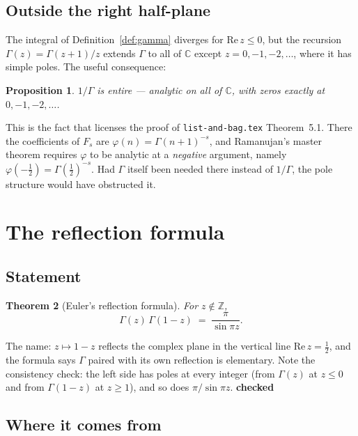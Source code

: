 \documentclass[11pt,a4paper]{article}
\newtheorem{theorem}{Theorem}[section]
\newtheorem{proposition}[theorem]{Proposition}
\theoremstyle{definition}
\theoremstyle{remark}
\newcommand{\CC}{\mathbb{C}}
\newcommand{\ZZ}{\mathbb{Z}}
\newcommand{\OK}{\textcolor{okgreen}{\textbf{checked}}}
\begin{document}
\subsection{Outside the right half-plane}

The integral of Definition~\ref{def:gamma} diverges for $\mathrm{Re}\,z \le 0$, but the
recursion $\Gamma(z) = \Gamma(z+1)/z$ extends $\Gamma$ to all of $\CC$ except
$z = 0, -1, -2, \dots$, where it has simple poles. The useful consequence:

\begin{proposition}\label{prop:entire}
$1/\Gamma$ is entire --- analytic on all of $\CC$, with zeros exactly at
$0, -1, -2, \dots$.
\end{proposition}

This is the fact that licenses the proof of \texttt{list-and-bag.tex}
Theorem~5.1. There the coefficients of $F_s$ are $\varphi(n) = \Gamma(n+1)^{-s}$, and
Ramanujan's master theorem requires $\varphi$ to be analytic at a \emph{negative}
argument, namely $\varphi(-\tfrac12) = \Gamma(\tfrac12)^{-s}$. Had $\Gamma$ itself
been needed there instead of $1/\Gamma$, the pole structure would have obstructed it.

\section{The reflection formula}

\subsection{Statement}

\begin{theorem}[Euler's reflection formula]\label{thm:reflect}
For $z \notin \ZZ$,
\[
  \Gamma(z)\,\Gamma(1-z) \;=\; \frac{\pi}{\sin \pi z} .
\]
\end{theorem}

The name: $z \mapsto 1-z$ reflects the complex plane in the vertical line
$\mathrm{Re}\,z = \tfrac12$, and the formula says $\Gamma$ paired with its own
reflection is elementary. Note the consistency check: the left side has poles at every
integer (from $\Gamma(z)$ at $z \le 0$ and from $\Gamma(1-z)$ at $z \ge 1$), and so
does $\pi/\sin\pi z$. \OK

\subsection{Where it comes from}
\end{document}
